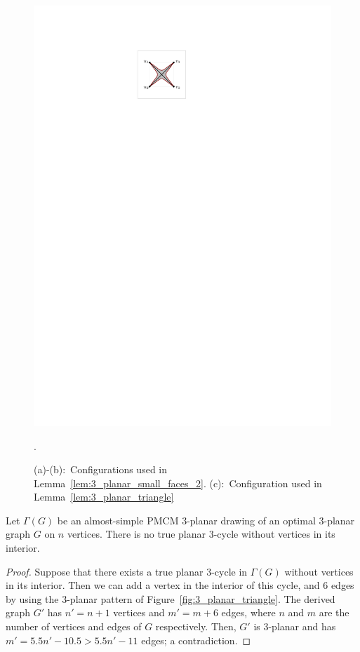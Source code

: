\begin{figure}[htb]
\begin{minipage}[b]{.24\textwidth}
        \includegraphics[width=\textwidth,page=3]{images/3planar_one_crossing}
        \subcaption{~}\label{fig:3_planar_triangle}
    \end{minipage}
    \caption{%
    (a)-(b):~Configurations used in Lemma~\ref{lem:3_planar_small_faces_2}. (c):~Configuration used in Lemma~\ref{lem:3_planar_triangle}}.
    \label{fig:3_planar_one_crossing_1}
\end{figure}

\begin{lemma}
Let $\Gamma(G)$ be an almost-simple PMCM $3$-planar drawing of an optimal $3$-planar graph $G$ on $n$ vertices. There is no true planar $3$-cycle without vertices in its interior. 
\label{lem:3_planar_triangle}
\end{lemma}
\begin{proof}
Suppose that there exists a true planar $3$-cycle in $\Gamma(G)$ without vertices in its interior. Then we can add a vertex in the interior of this cycle, and $6$ edges by using the $3$-planar pattern of Figure~\ref{fig:3_planar_triangle}. The derived graph $G'$ has $n'=n+1$ vertices and $m'=m+6$ edges, where $n$ and $m$ are the number of vertices and edges of $G$ respectively. Then, $G'$ is $3$-planar and has $m'=5.5n'-10.5>5.5n'-11$ edges; a contradiction.
\end{proof}


